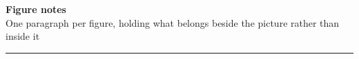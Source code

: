 \documentclass[9pt,a4paper]{article}
\begin{document}
\newpage
{\fontsize{11}{13}\selectfont\bfseries Figure notes}\\[1.5pt]
{\fontsize{8.6}{10}\selectfont One paragraph per figure, holding what belongs
beside the picture rather than inside it}\\[2pt]
{\color{rulegrey}\rule{\textwidth}{0.9pt}}\\[2pt]
\end{document}

